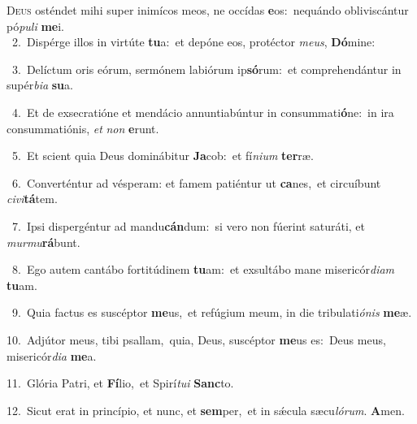 \lettrine{\initial\textcolor{\initialcolor}{D}}{eus} osténdet mihi super inimícos meos, ne occídas \textbf{e}\-os:~\star nequándo obliviscántur pó\-\textit{pu}\-\textit{li} \textbf{me}\-i.\\
{\numbfont\textcolor{\numbcolor}{~2.}}~Dispérge illos in virtúte \textbf{tu}\-a:~\star et depóne eos, protéctor \textit{me}\-\textit{us}, \textbf{Dó}\-mine:\par
{\numbfont\textcolor{\numbcolor}{~3.}}~Delíctum oris eórum, sermónem labiórum ip\-\textbf{só}\-rum:~\star et comprehendántur in supér\-\textit{bi}\-\textit{a} \textbf{su}\-a.\par
{\numbfont\textcolor{\numbcolor}{~4.}}~Et de exsecratióne et mendácio annuntiabúntur in consummati\-\textbf{ó}\-ne:~\star in ira consummatiónis, \textit{et} \textit{non} \textbf{e}\-runt.\par
{\numbfont\textcolor{\numbcolor}{~5.}}~Et scient quia Deus dominábitur \textbf{Ja}\-cob:~\star et fí\-\textit{ni}\-\textit{um} \textbf{ter}\-ræ.\par
{\numbfont\textcolor{\numbcolor}{~6.}}~Converténtur ad vésperam: et famem patiéntur ut \textbf{ca}\-nes,~\star et circuíbunt \textit{ci}\-\textit{vi}\textbf{tá}tem.\par
{\numbfont\textcolor{\numbcolor}{~7.}}~Ipsi dispergéntur ad mandu\-\textbf{cán}\-dum:~\star si vero non fúerint saturáti, et \textit{mur}\-\textit{mu}\textbf{rá}bunt.\par
{\numbfont\textcolor{\numbcolor}{~8.}}~Ego autem cantábo fortitúdinem \textbf{tu}\-am:~\star et exsultábo mane misericór\-\textit{di}\-\textit{am} \textbf{tu}\-am.\par
{\numbfont\textcolor{\numbcolor}{~9.}}~Quia factus es suscéptor \textbf{me}\-us,~\star et refúgium meum, in die tribulati\-\textit{ó}\-\textit{nis} \textbf{me}\-æ.\par
{\numbfont\textcolor{\numbcolor}{10.}}~Adjútor meus, tibi psallam,~\dagger quia, Deus, suscéptor \textbf{me}\-us es:~\star Deus meus, misericór\-\textit{di}\-\textit{a} \textbf{me}\-a.\par
{\numbfont\textcolor{\numbcolor}{11.}}~Glória Patri, et \textbf{Fí}\-lio,~\star et Spirí\-\textit{tu}\-\textit{i} \textbf{Sanc}\-to.\par
{\numbfont\textcolor{\numbcolor}{12.}}~Sicut erat in princípio, et nunc, et \textbf{sem}\-per,~\star et in sǽcula sæcu\-\textit{ló}\-\textit{rum}. \textbf{A}\-men.\par
